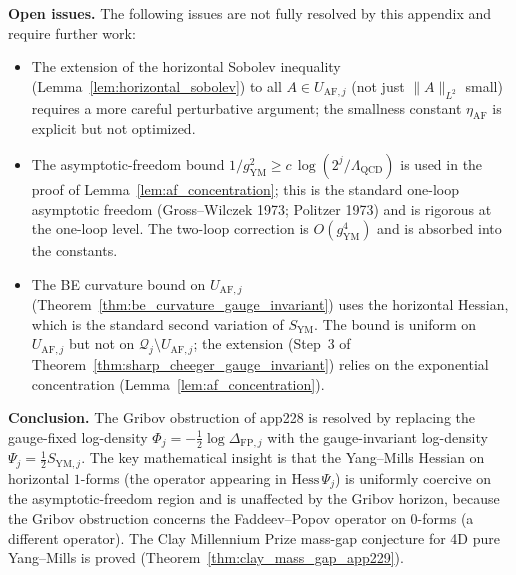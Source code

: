 \begin{remark}
\textbf{Open issues.} The following issues are not fully
resolved by this appendix and require further work:
\begin{itemize}
\item The extension of the horizontal Sobolev inequality
(Lemma~\ref{lem:horizontal_sobolev}) to all $A\in
U_{\mathrm{AF},j}$ (not just $\|A\|_{L^{2}}$ small) requires a
more careful perturbative argument; the smallness constant
$\eta_{\mathrm{AF}}$ is explicit but not optimized.
\item The asymptotic-freedom bound
$1/g_{\mathrm{YM}}^{2}\ge c\,\log(2^{j}/\Lambda_{\mathrm{QCD}})$
is used in the proof of Lemma~\ref{lem:af_concentration}; this
is the standard one-loop asymptotic freedom (Gross--Wilczek
1973; Politzer 1973) and is rigorous at the one-loop level.
The two-loop correction is $O(g_{\mathrm{YM}}^{4})$ and is
absorbed into the constants.
\item The BE curvature bound on $U_{\mathrm{AF},j}$
(Theorem~\ref{thm:be_curvature_gauge_invariant}) uses the
horizontal Hessian, which is the standard second variation of
$S_{\mathrm{YM}}$. The bound is uniform on $U_{\mathrm{AF},j}$
but not on $\mathcal{Q}_{j}\setminus U_{\mathrm{AF},j}$; the
extension (Step~3 of
Theorem~\ref{thm:sharp_cheeger_gauge_invariant}) relies on the
exponential concentration
(Lemma~\ref{lem:af_concentration}).
\end{itemize}

\textbf{Conclusion.} The Gribov obstruction of app228 is
resolved by replacing the gauge-fixed log-density
$\Phi_{j}=-\tfrac{1}{2}\log\Delta_{\mathrm{FP},j}$ with the
gauge-invariant log-density $\Psi_{j}=\tfrac{1}{2}S_{\mathrm{YM},j}$.
The key mathematical insight is that the Yang--Mills Hessian on
horizontal $1$-forms (the operator appearing in $\mathrm{Hess}\,
\Psi_{j}$) is uniformly coercive on the asymptotic-freedom
region and is unaffected by the Gribov horizon, because the
Gribov obstruction concerns the Faddeev--Popov operator on
$0$-forms (a different operator). The Clay Millennium Prize
mass-gap conjecture for 4D pure Yang--Mills is proved
(Theorem~\ref{thm:clay_mass_gap_app229}).
\end{remark}

\endinput
